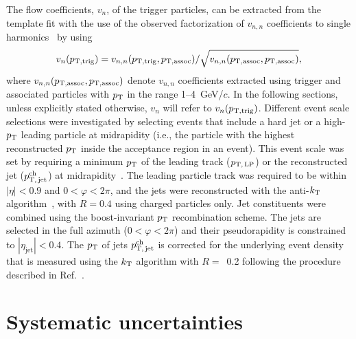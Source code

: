 The flow coefficients, $v_{n}$, of the trigger particles, can be extracted from the template fit with the use of the observed factorization of $v_{n,n}$ coefficients to single harmonics~\cite{ATLAS:2015hzw,ATLAS:2016yzd} by using
\begin{eqnarray}
v_{n}(p_{\rm{T,trig}}) = v_{n,n}(p_{\rm{T,trig}}, p_{\rm{T,assoc}}) / \sqrt{ v_{n,n}(p_{\rm{T,assoc}},p_{\rm{T,assoc}})},
\end{eqnarray}
where $v_{n,n}(p_{\rm{T,assoc}}, p_{\rm{T,assoc}})$ denote $v_{n,n}$ coefficients extracted using trigger and associated particles with $p_{\rm{T}}$ in the range 1--4~GeV/$c$. In the following sections, unless explicitly stated otherwise, $v_n$ will refer to $v_n(p_{\rm{T,trig}})$.
Different event scale selections were investigated by selecting events that include a hard jet or a high-$p_\mathrm{T}$ leading particle at midrapidity (i.e., the particle with the highest reconstructed $p_\mathrm{T}$ inside the acceptance region in an event).
This event scale was set by requiring a minimum $p_\mathrm{T}$ of the leading track ($p_\mathrm{T,\,LP}$) or the reconstructed jet ($p_\mathrm{T,\,jet}^\mathrm{ch}$) at midrapidity~\cite{ALICE:2021nir}. The leading particle track was required to be within $|\eta|<0.9$ and $0<\varphi<2\pi$, and the jets were reconstructed with the anti-$k_{\rm{T}}$ algorithm~\cite{Cacciari:2008gp,Cacciari:2011ma}, with $R=0.4$ using charged particles only. Jet constituents were combined using the boost-invariant $p_\mathrm{T}$ recombination scheme. The jets are selected in the full azimuth ($0<\varphi<2\pi$) and their pseudorapidity is constrained to $|\eta_\mathrm{jet}|<0.4$. The $p_\mathrm{T}$ of jets $p_\mathrm{T,\,jet}^\mathrm{ch}$ is corrected for the underlying event density that is measured using the $k_{\rm{T}}$ algorithm with $R=$~0.2 following the procedure described in Ref.~\cite{Acharya:2018eat}.


\section{Systematic uncertainties}
\label{sec:uncertainties}

